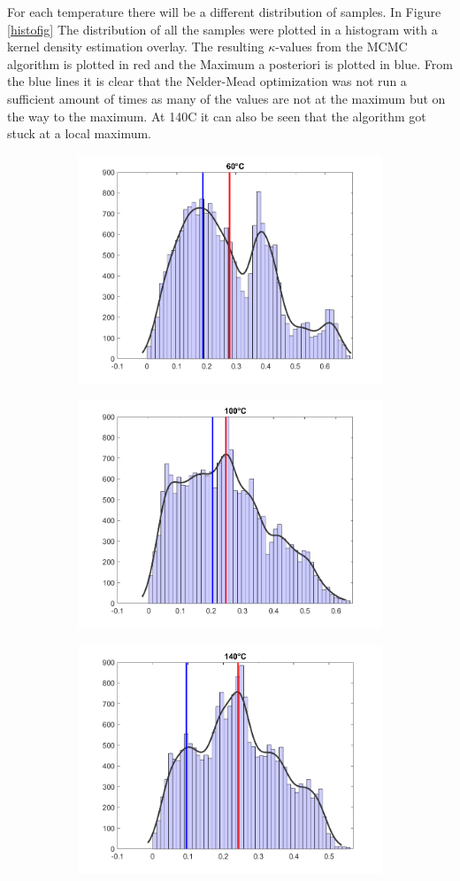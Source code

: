  For each temperature there will be a different distribution of samples. 
 In Figure \ref{histofig} The distribution of all the samples were plotted in a histogram with a kernel density estimation overlay. 
 The resulting $\kappa$-values from the MCMC algorithm is plotted in red and the Maximum a posteriori is plotted in blue.
 From the blue lines it is clear that the Nelder-Mead optimization was not run a sufficient amount of times as many of the values are not at the maximum but on the way to the maximum.
 At 140\textdegree C it can also be seen that the algorithm got stuck at a local maximum.
 
\begin{figure}[b]
\label{histofig}
\centering
	\begin{subfigure}{}
	\centering
	\includegraphics[width = 0.45\linewidth]{figures/histograph/histo1.png}
	\end{subfigure}
	\begin{subfigure}{}
	\centering
	\includegraphics[width = 0.45\linewidth]{figures/histograph/histo2.png}
	\end{subfigure}
	\begin{subfigure}{}
	\centering
	\includegraphics[width = 0.45\linewidth]{figures/histograph/histo3.png}

\end{subfigure}
\end{figure}
